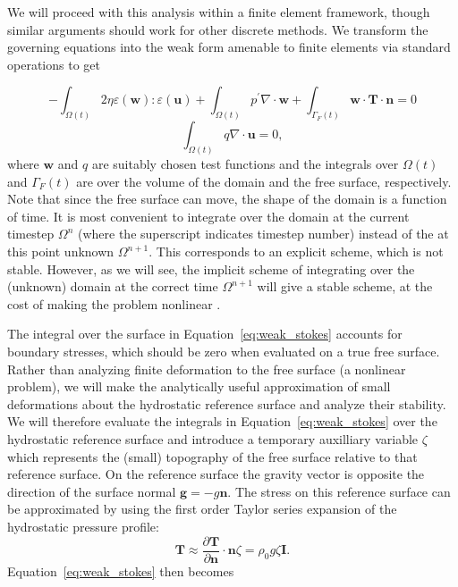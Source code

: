 \documentclass[preprint,12pt,authoryear]{elsarticle}
\begin{document}
We will proceed with this analysis within a finite element framework, though similar arguments should 
work for other discrete methods.
We transform the governing equations into the weak form amenable to finite elements via standard operations \citep[e.g.][]{zienkiewicz1977finite} to get

\begin{equation}
-\int_{\Omega(t)} 2 \eta \varepsilon( \mathbf{w} ) \colon \varepsilon( \mathbf{u} ) + \int_{\Omega(t)} p^\prime \nabla \cdot \mathbf{w} 
+ \int_{\Gamma_F(t)} \mathbf{w} \cdot \mathbf{T} \cdot \mathbf{n} = 0 
\label{eq:weak_stokes}
\end{equation}
\begin{equation}
\int_{\Omega(t)} q \nabla \cdot \mathbf{u} = 0,
\label{eq:weak_incompressible}
\end{equation}
where $\mathbf{w}$ and $q$ are suitably chosen test functions and the integrals over 
$\Omega(t)$ and $\Gamma_F(t)$ are over the volume of the domain and the free surface, respectively.
Note that since the free surface can move, the shape of the domain is a function of time.
It is most convenient to integrate over the domain at the current timestep $\Omega^n$ 
(where the superscript indicates timestep number) instead of 
the at this point unknown $\Omega^{n+1}$. This corresponds to an explicit scheme,
which is not stable.
However, as we will see, the implicit scheme of integrating over the (unknown) domain at the correct time $\Omega^{n+1}$ will
give a stable scheme, at the cost of making the problem nonlinear \citep{furuichi2015implicit}.

The integral over the surface in Equation~\eqref{eq:weak_stokes} accounts for boundary stresses, 
which should be zero when evaluated on a true free surface.
Rather than analyzing finite deformation to the free surface (a nonlinear problem),
we will make the analytically useful approximation of small deformations about the hydrostatic 
reference surface and analyze their stability.
We will therefore  evaluate the integrals in Equation~\eqref{eq:weak_stokes} 
over the hydrostatic reference surface and introduce a temporary auxilliary variable $\zeta$ which 
represents the (small) topography of the free surface relative to that reference surface.
On the reference surface the gravity vector is opposite the direction of the surface normal $\mathbf{g} = -g \mathbf{n}$.
The stress on this reference surface can be approximated by using the first order Taylor series
expansion of the hydrostatic pressure profile:
\begin{equation}
\mathbf{T} \approx \frac{\partial \mathbf{T}}{\partial \mathbf{n} } \cdot \mathbf{n} \zeta = \rho_0 g \zeta \mathbf{I}.
\label{eq:hydrostatic}
\end{equation}
Equation~\eqref{eq:weak_stokes} then becomes
\end{document}
